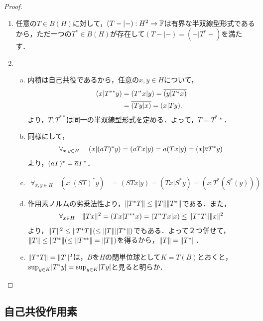 \documentclass[uplatex,dvipdfmx]{jsreport}
\begin{document}
\begin{proof}\mbox{}
    \begin{enumerate}
        \item 任意の$T\in B(H)$に対して，$(T-|-):H^2\to\mathbb{F}$は有界な半双線型形式であるから，ただ一つの$T^*\in B(H)$が存在して$(T-|-)=(-|T^*-)$を満たす．
        \item \begin{enumerate}[(a)]
            \item 内積は自己共役であるから，任意の$x,y\in H$について，
            \begin{align*}
                (x|T^{**}y)&=(T^*x|y)=\overline{(y|T^*x)}\\
                &=\overline{(Ty|x)}=(x|Ty).
            \end{align*}
            より，$T,T^{**}$は同一の半双線型形式を定める．よって，$T=T^**$．
            \item 同様にして，
            \begin{align*}
                \forall_{x,y\in H}\;\quad(x|(aT)^*y)=(aTx|y)=a(Tx|y)=(x|\overline{a}T^*y)
            \end{align*}
            より，$(aT)^*=\overline{a}T^*$．
            \item \begin{align*}
                \forall_{x,y\in H}\quad(x|(ST)^*y)&=(STx|y)=(Tx|S^*y)=(x|T^*(S^*(y)))
            \end{align*}
            \item 作用素ノルムの劣乗法性より，$\|T^*T\|\le\|T\|\|T^*\|$である．また，
            \begin{align*}
                \forall_{x\in H}\quad\|Tx\|^2=(Tx|T^{**}x)=(T^*Tx|x)\le\|T^*T\|\|x\|^2
            \end{align*}
            より，$\|T\|^2\le\|T^*T\|(\le\|T\|\|T^*\|)$でもある．よって２つ併せて，$\|T\|\le\|T^*\|(\le\|T^{**}\|=\|T\|)$を得るから，$\|T\|=\|T^*\|$．
            \item $\|T^*T\|=\|T\|^2$は，$B$を$H$の閉単位球として$K=T(B)$とおくと，
            $\sup_{y\in K}\lvert T^*y\rvert=\sup_{y\in K}\lvert Ty\rvert$と見ると明らか．
        \end{enumerate}
    \end{enumerate}
\end{proof}

\subsection{自己共役作用素}
\end{document}
